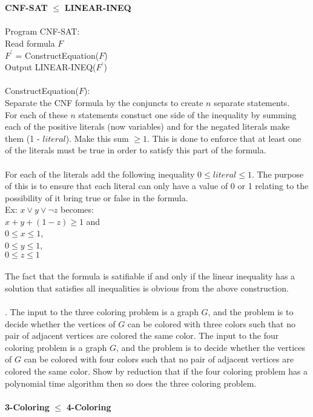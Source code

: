 \documentclass[10pt]{article}
\newcommand{\tab}{\hspace*{2em}}
\begin{document}
	\\
	\\
	\textbf{CNF-SAT} $\leq$ \textbf{LINEAR-INEQ}\\
	\\
	Program CNF-SAT:\\
	\tab Read formula $F$\\
	\tab $F^\prime$ = ConstructEquation($F$)\\ 
	\tab Output	LINEAR-INEQ($F^\prime$)\\
	\\
	ConstructEquation($F$):\\
	Separate the CNF formula by the conjuncts to create $n$ separate statements.\\
	For each of these $n$ statements constuct one side of the inequality by 
	summing each of the positive literals (now variables) and for the negated literals
	make them (1 - $literal$). 
	Make this sum $\geq 1$. This is done to enforce that at least one of the literals
	must be true in order to satisfy this part of the formula.\\
	\\
	For each of the literals add the following inequality $0 \leq literal \leq 1$. The
	purpose of this is to ensure that each literal can only have a value of 0 or 1 relating
	to the possibility of it bring true or false in the formula.  
	\\
	Ex: $x \vee y \vee \neg z$ becomes:\\ 
	$x + y + (1 - z) \geq 1$ and\\
	$0 \leq x \leq 1$,\\
	$0 \leq y \leq 1$,\\
	$0 \leq z \leq 1$\\
	\\
	The fact that the formula is satifiable if and only if the linear inequality has a solution that satisfies all
	inequalities is obvious from the above construction.\\
	\\
	.  The input to the three coloring problem is a graph $G$, and the problem is to decide whether the vertices
of $G$ can be colored with three colors such that no pair of adjacent vertices are colored the same color.
The input to the four coloring problem is a graph $G$, and the problem is to decide whether the vertices
of $G$ can be colored with four colors such that no pair of adjacent vertices are colored the same color.
Show by reduction that if the four coloring problem has a polynomial time algorithm then so does the
three coloring problem.\\
	\\
	\textbf{3-Coloring} $\leq$ \textbf{4-Coloring}\\
	\\
\end{document}

